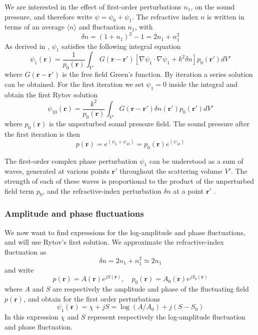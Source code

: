 We are interested in the effect of first-order perturbations $n_1$, on the sound pressure,
and therefore write $\psi = \psi_0 + \psi_1$. The refractive index $n$ is written in terms of
an average $\langle n \rangle$ and fluctuation $n_1$, with
\begin{equation}
 \delta n = (1 + n_1)^2 -1 = 2 n_1 + n_1^2
\end{equation}
As derived in \cite{Ishimaru1997}, $\psi_{1}$ satisfies the following integral equation
\begin{equation}
 \psi_{1}(\mathbf{r}) = \frac{1}{p_0(\mathbf{r})} \int_{V'} G(\mathbf{r}-\mathbf{r}') \left[ \nabla \psi_1 \cdot \nabla \psi_1 + k^2 \delta n  \right]  p_0(\mathbf{r}') dV'
\end{equation}
where $G(\mathbf{r}-\mathbf{r}')$ is the free field Green's function. By iteration a series solution can be obtained. For the first iteration we set $\psi_1 = 0$ inside the integral and obtain the first Rytov solution
\begin{equation}
 \psi_{10}(\mathbf{r}) = \frac{k^2}{p_0(\mathbf{r})} \int_{V'} G(\mathbf{r}-\mathbf{r}') \delta n(\mathbf{r}') p_0(\mathbf{r}') dV'
\end{equation}
where $p_0(\mathbf{r})$ is the unperturbed sound pressure field. %
The sound pressure after the first iteration is then
\begin{equation}
 p (\mathbf{r}) = e^{(\psi_0 + \psi_{10})} = p_0(\mathbf{r}) e^{(\psi_{10})}
\end{equation}

The first-order complex phase perturbation $\psi_{1}$ can be understood as a sum
of waves, generated at various points $\mathbf{r}'$ throughout the scattering
volume $V'$. The strength of each of these waves is proportional to the product
of the unperturbed field term ${p_0}$, and the refractive-index perturbation
$\delta n$ at a point $\mathbf{r}'$ \cite{Jurado-navas2006}.

\subsubsection*{Amplitude and phase fluctuations}
We now want to find expressions for the log-amplitude and phase fluctuations, and will use Rytov's first solution.
We approximate the refractive-index fluctuation as
\begin{equation}
 \delta n = 2 n_1 + n_1^2 \simeq 2 n_1
\end{equation}
and write
\begin{equation}\label{eq:complex_exponential}
 p(\mathbf{r}) = A(\mathbf{r}) e^{jS(\mathbf{r})},  \quad p_0(\mathbf{r}) = A_0(\mathbf{r}) e^{jS_0(\mathbf{r})}
\end{equation}
where $A$ and $S$ are respectively the amplitude and phase of the fluctuating field $p(\mathbf{r})$,
and obtain for the first order perturbations
\begin{equation}\label{eq:chi_and_S}
 \psi_1 ({\mathbf{r}}) = \chi + j S = \log{(A/A_0)} + j (S-S_0)
\end{equation}
In this expression $\chi$ and $S$ represent respectively the log-amplitude fluctuation and phase fluctuation.

